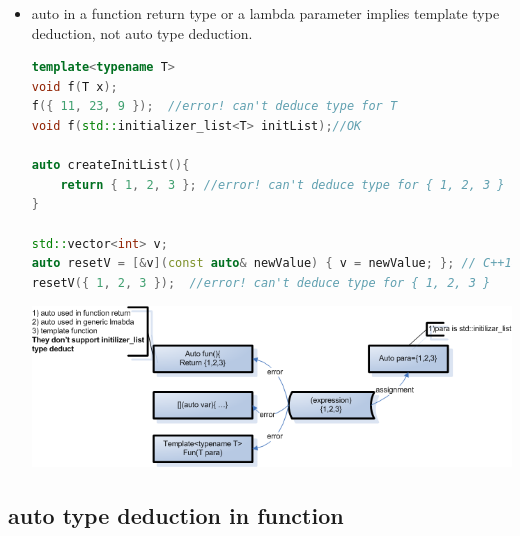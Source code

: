 \documentclass[a4paper,11pt,twoside]{book}
\begin{document}
\begin{itemize}
	\item auto in a function return type or a lambda parameter implies template type deduction, not auto type deduction.
\begin{lstlisting}[frame=single, language=c++]
template<typename T>  
void f(T x);
f({ 11, 23, 9 });  //error! can't deduce type for T
void f(std::initializer_list<T> initList);//OK
	
auto createInitList(){
	return { 1, 2, 3 }; //error! can't deduce type for { 1, 2, 3 }
}
	
std::vector<int> v;
auto resetV = [&v](const auto& newValue) { v = newValue; }; // C++14
resetV({ 1, 2, 3 });  //error! can't deduce type for { 1, 2, 3 }
\end{lstlisting}

	\begin{center}
        \includegraphics[scale=0.6]{pics/autotype.png}
    \end{center}


\end{itemize}

\subsection{auto type deduction in function}
\end{document}
